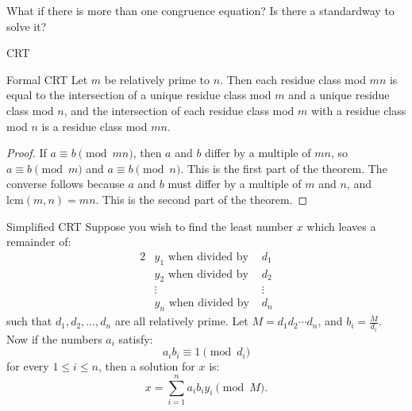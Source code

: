 
\begin{shortque}[Introduction]{}

    What if there is more than one congruence equation? Is there a standardway to solve it?
\end{shortque}

\begin{mysubsection}{CRT}
    \begin{theorem}[thm:]{Formal CRT}
        Let $m$ be relatively prime to $n$. Then each residue class mod $mn$ is equal to the intersection of a unique residue class mod $m$ and a unique residue class mod $n$, and the intersection of each residue class mod $m$ with a residue class mod $n$ is a residue class mod $mn$. 
    \end{theorem}

    \begin{proof}
        If $a \equiv b \pmod{mn}$, then $a$ and $b$ differ by a multiple of $mn$, so $a \equiv b \pmod{m}$ and $a \equiv b \pmod{n}$. This is the first part of the theorem. The converse follows because $a$ and $b$ must differ by a multiple of $m$ and $n$, and $\mbox{lcm}(m,n) = mn$. This is the second part of the theorem. 
    \end{proof}

    \begin{theorem}[thm:]{Simplified CRT}
        Suppose you wish to find the least number $x$ which leaves a remainder of:
        \begin{alignat*}{2}
             &y_{1} \text{ when divided by } &d_{1}\\ &y_{2} \text{ when divided by } &d_{2}\\ &\vdots &\vdots\\ &y_{n} \text{ when divided by } & d_{n}
        \end{alignat*}
        such that $d_{1}, d_{2},\dots ,d_{n}$ are all relatively prime. Let $M = d_{1}d_{2} \cdots d_{n}$, and $b_{i} = \frac{M}{d_{i}}$. Now if the numbers $a_{i}$ satisfy:
        \[a_{i}b_{i} \equiv 1 \pmod {d_{i}}\]
        for every $1 \leq i \leq n$, then a solution for $x$ is:
        \[x = \sum_{i=1}^n a_{i}b_{i}y_{i} \pmod M.\]
    \end{theorem}
\end{mysubsection}

